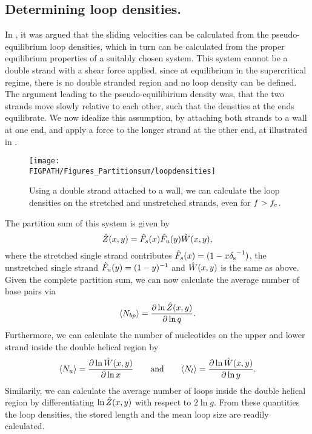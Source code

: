 \subsection{Determining loop densities.}
In , it was argued that the sliding velocities can be calculated from the 
pseudo-equilibrium loop densities, which in turn can be calculated from the proper equilibrium 
properties of a suitably chosen system. This system cannot be a double
strand with a shear force applied, since at equilibrium in the supercritical regime, there is no double stranded
region and no loop density can be defined. The argument leading to the pseudo-equilibirium density 
was, that the two strands move slowly relative to each other, such that the densities at the ends 
equilibrate. We now idealize this assumption, by attaching both strands to a wall at one end, and apply
a force to the longer strand at the other end, at illustrated in .
\begin{figure}
\centering
\texttt{[image: \\FIGPATH/Figures\_Partitionsum/loopdensities]}
\caption[Calculating loop densities.]{\label{fig:loop_densities} Using a double strand attached to a wall, we can 
calculate the loop densities on the stretched and unstretched strands, even for $f>{f_c}$.}
\end{figure}
The partition sum of this system is given by 
\begin{equation}
\label{eq:Z_fdenat}
  \hat{Z}(x,y)=\hat{F}_s(x)\hat{F}_u(y)\hat{W}(x,y),
\end{equation}
where the stretched single strand contributes $\hat{F}_s(x)=(1-x{\delta_{\rm s}}^{{-1}})$, the unstretched single strand
$\hat{F}_u(y)=(1-y)^{-1}$ and $\hat{W}(x,y)$ is the same as above. Given the complete partition sum, we can now
calculate the average number of base pairs via
\begin{equation}
	\langle N_{bp}\rangle=\frac{\partial \ln \hat{Z}(x,y)}{\partial \ln q}.
\end{equation}
Furthermore, we can calculate the number of nucleotides on the upper and lower strand inside the 
double helical region by 
\begin{equation}
	\langle N_{u}\rangle=\frac{\partial \ln \hat{W}(x,y)}{\partial \ln x} \qquad \mathrm{and} \qquad
	\langle N_{l}\rangle=\frac{\partial \ln \hat{W}(x,y)}{\partial \ln y}.
\end{equation}
Similarily, we can calculate the average number of loops inside the double helical region by differentiating
$\ln \hat{Z}(x,y)$ with respect to $2\ln g$. From these quantities the loop densities, the stored length and 
the mean loop size are readily calculated. 



